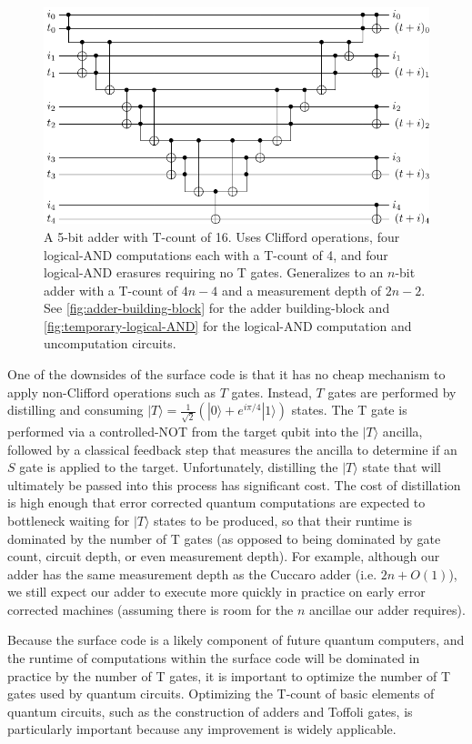 \documentclass[twocolumn,accepted=2018-05-25]{quantumarticle}
\begin{document}
\begin{figure}
  \includegraphics[width=\linewidth]{adder.pdf}
  \caption{
	A 5-bit adder with T-count of 16.
	Uses Clifford operations, four logical-AND computations each with a T-count of 4, and four logical-AND erasures requiring no T gates.
	Generalizes to an $n$-bit adder with a T-count of $4n - 4$ and a measurement depth of $2n - 2$.
	See \autoref{fig:adder-building-block} for the adder building-block and \autoref{fig:temporary-logical-AND} for the logical-AND computation and uncomputation circuits.
  }
  \label{fig:adder}
\end{figure}

One of the downsides of the surface code is that it has no cheap mechanism to apply non-Clifford operations such as $T$ gates.
Instead, $T$ gates are performed by distilling and consuming $|T\rangle = \frac{1}{\sqrt{2}} (|0\rangle + e^{i \pi/4} |1\rangle)$ states.
The T gate is performed via a controlled-NOT from the target qubit into the $|T\rangle$ ancilla, followed by a classical feedback step that measures the ancilla to determine if an $S$ gate is applied to the target.
Unfortunately, distilling the $|T\rangle$ state that will ultimately be passed into this process has significant cost.
The cost of distillation is high enough that error corrected quantum computations are expected to bottleneck waiting for $|T\rangle$ states to be produced, so that their runtime is dominated by the number of T gates (as opposed to being dominated by gate count, circuit depth, or even measurement depth).
For example, although our adder has the same measurement depth as the Cuccaro adder (i.e. $2n + O(1)$), we still expect our adder to execute more quickly in practice on early error corrected machines (assuming there is room for the $n$ ancillae our adder requires).

Because the surface code is a likely component of future quantum computers, and the runtime of computations within the surface code will be dominated in practice by the number of T gates, it is important to optimize the number of T gates used by quantum circuits.
Optimizing the T-count of basic elements of quantum circuits, such as the construction of adders and Toffoli gates, is particularly important because any improvement is widely applicable.
\end{document}
